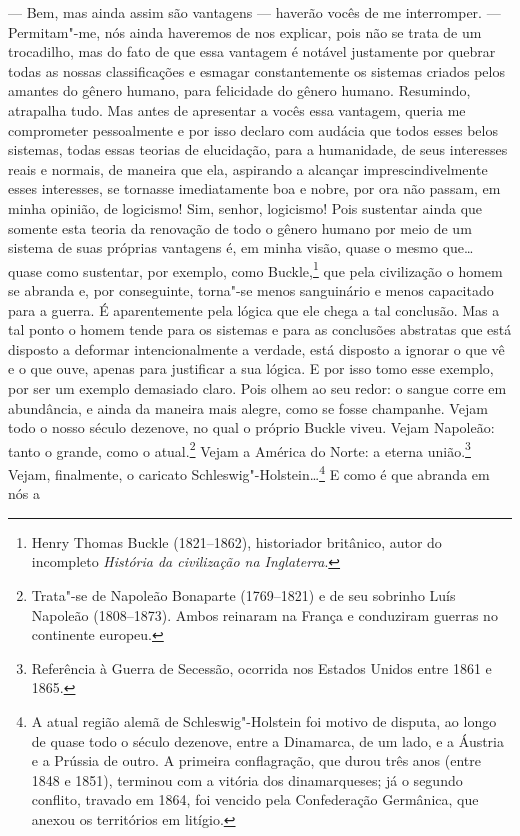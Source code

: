--- Bem, mas ainda assim são vantagens --- haverão vocês de me interromper.
--- Permitam"-me, nós ainda haveremos de nos explicar, pois não se trata de um
trocadilho, mas do fato de que essa vantagem é notável justamente por quebrar
todas as nossas classificações e esmagar constantemente os sistemas criados
pelos amantes do gênero humano, para felicidade do gênero humano. Resumindo,
atrapalha tudo. Mas antes de apresentar a vocês essa vantagem, queria me
comprometer pessoalmente e por isso declaro com audácia que todos esses belos
sistemas, todas essas teorias de elucidação, para a humanidade, de seus
interesses reais e normais, de maneira que ela, aspirando a alcançar
imprescindivelmente esses interesses, se tornasse imediatamente boa e nobre,
por ora não passam, em minha opinião, de logicismo! Sim, senhor, logicismo! Pois
sustentar ainda que somente esta teoria da renovação de todo o gênero humano
por meio de um sistema de suas próprias vantagens é, em minha visão, quase o
mesmo que\ldots{} quase como sustentar, por exemplo, como Buckle,\footnote{
Henry Thomas Buckle (1821--1862), historiador britânico, autor do incompleto
\textit{História da civilização na Inglaterra}.} que pela civilização o homem
se abranda e, por conseguinte, torna"-se menos sanguinário e menos capacitado
para a guerra. É aparentemente pela lógica que ele chega a tal conclusão. Mas a
tal ponto o homem tende para os sistemas e para as conclusões abstratas que
está disposto a deformar intencionalmente a verdade, está disposto a ignorar o
que vê e o que ouve, apenas para justificar a sua lógica. E por isso tomo esse
exemplo, por ser um exemplo demasiado claro. Pois olhem ao seu redor: o sangue
corre em abundância, e ainda da maneira mais alegre, como se fosse champanhe.
Vejam todo o nosso século  dezenove, no qual o próprio Buckle viveu. Vejam Napoleão:
tanto o grande, como o atual.\footnote{ Trata"-se de Napoleão Bonaparte
(1769--1821) e de seu sobrinho Luís Napoleão (1808--1873). Ambos reinaram na
França e conduziram guerras no continente europeu.} Vejam a América do Norte: a
eterna união.\footnote{ Referência à Guerra de Secessão, ocorrida nos Estados
Unidos entre 1861 e 1865.} Vejam, finalmente, o caricato
Schleswig"-Holstein\ldots{}\footnote{ A atual região alemã de Schleswig"-Holstein
foi motivo de disputa, ao longo de quase todo o século  dezenove, entre a Dinamarca,
de um lado, e a Áustria e a Prússia de outro. A primeira conflagração, que
durou três anos (entre 1848 e 1851), terminou com a vitória dos dinamarqueses;
já o segundo conflito, travado em 1864, foi vencido pela Confederação
Germânica, que anexou os territórios em litígio.} E como é que abranda em nós a
